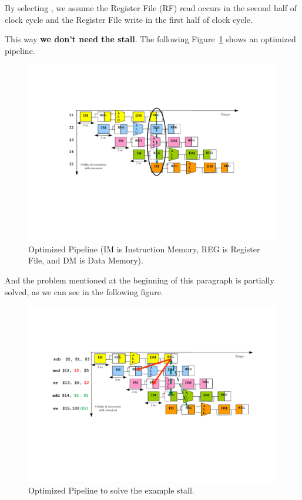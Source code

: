 \begin{definitionbox}
    By selecting , we assume the Register File (RF) read occurs in the second half of clock cycle and the Register File write in the first half of clock cycle.
\end{definitionbox}

\noindent
This way \textbf{we don't need the stall}. The following Figure~\ref{fig: Optimized Pipeline} shows an optimized pipeline.

\newpage

\begin{figure}[!htp]
    \centering
    \includegraphics[width=\textwidth]{img/optimized-pipeline-1.pdf}
    \caption{Optimized Pipeline (IM is Instruction Memory, REG is Register File, and DM is Data Memory).\cite{pipelining-slides}}
    \label{fig: Optimized Pipeline}
\end{figure}

\noindent
And the problem mentioned at the beginning of this paragraph is partially solved, as we can see in the following figure.
\begin{figure}[!htp]
    \centering
    \includegraphics[width=\textwidth]{img/optimized-pipeline-2.pdf}
    \caption{Optimized Pipeline to solve the example stall.\cite{pipelining-slides}}
\end{figure}